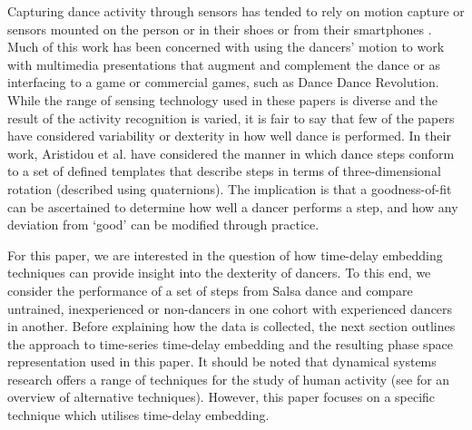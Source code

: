 \documentclass{sigchi}
\begin{document}
Capturing dance activity through sensors has tended to rely on motion capture 
\cite{Alexiadis2014} %
or sensors mounted on the person \cite{Lynch2005} %
or in their shoes \cite{Paradiso1997} %
or from their smartphones  \cite{Wei2014}. %
Much of this work has been concerned with using the dancers’ motion to work with 
multimedia presentations that augment and complement the dance \cite{Griffith1998, Park2006}
or as interfacing to a game \cite{Chu2012} %
or commercial games, such as Dance Dance Revolution.  
While the range of sensing technology used in these papers is diverse and the result of the activity 
recognition is varied, it is fair to say that few of the papers have considered 
variability or dexterity in how well dance is performed. 
In their work, Aristidou et al. \cite{Aristidou2014} %
have considered the manner in which dance steps conform to a set of defined 
templates that describe steps in terms of three-dimensional rotation (described using quaternions).  
The implication is that a goodness-of-fit can be ascertained to determine how well a dancer performs a step, 
and how any deviation from ‘good’ can be modified through practice. 

For this paper, we are interested in the question of how 
time-delay embedding techniques can provide insight into the dexterity of dancers. 
To this end, we consider the performance of a set of steps from Salsa dance and 
compare untrained, inexperienced or non-dancers in one cohort with experienced dancers in another. 
Before explaining how the data is collected, the next section outlines the approach to time-series 
time-delay embedding and the resulting phase space representation
used in this paper. 
It should be noted that dynamical systems research offers a range of techniques for the study of human activity 
(see \cite{Guastello2011} for an overview of alternative techniques). 
However, this paper focuses on a specific technique which utilises time-delay embedding.
\end{document}
